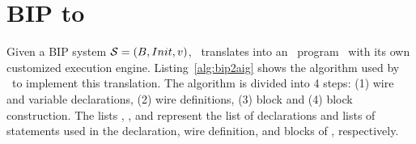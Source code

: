


\section{BIP to \thislanguage}
\label{chap3:bip2aig:bip2etc}
Given a BIP system $\mathcal{S} = (B, Init, v)$, \biptool~translates \Pm into 
an \thislanguage~program \aigcircuit~with its own customized execution engine. 
Listing~\ref{alg:bip2aig} shows the algorithm used by \biptool~to implement 
this translation. The algorithm is divided into 4 steps: (1) wire and variable
declarations, (2) wire definitions, (3)  block and (4)  block construction. 
The lists , ,  and 
represent the list of declarations and lists of statements  used in the 
declaration, wire definition,  and  blocks of \aigcircuit, respectively. 

